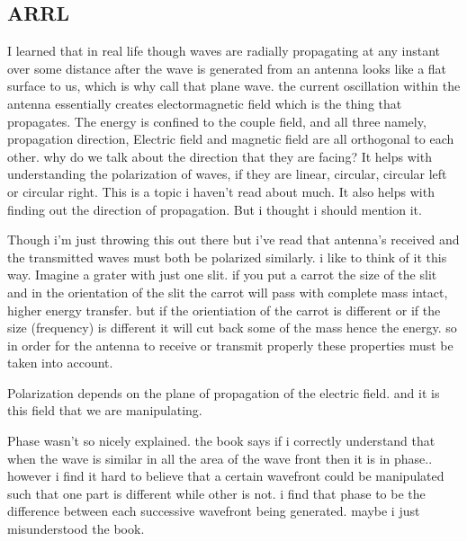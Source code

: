\documentclass[12pt]{article}
\begin{document}
\subsection*{ARRL}
I learned that in real life though waves are radially propagating at any instant over some distance after the wave is generated from an antenna looks like a flat surface to us, which is why call that plane wave. 
the current oscillation within the antenna essentially creates electormagnetic field which is the thing that propagates. 
The energy is confined to the couple field, and all three namely, propagation direction, Electric field and magnetic field are all orthogonal to each other. why do we talk about the direction that they are facing? 
It helps with understanding the polarization of waves, if they are linear, circular, circular left or circular right. This is a topic i haven't read about much. It also helps with finding out the direction of propagation. 
But i thought i should mention it. 

Though i'm just throwing this out there but i've read that antenna's received and the transmitted waves must both be polarized similarly. i like to think of it this way. 
Imagine a grater with just one slit. if you put a carrot the size of the slit and in the orientation of the slit the carrot will pass with complete mass intact,
higher energy transfer. but if the orientiation of the carrot is different or if the size (frequency) is different it will cut back some of the mass hence the energy. 
so in order for the antenna to receive or transmit properly these properties must be taken into account.

Polarization depends on the plane of propagation of the electric field. and it is this field that we are manipulating. 

Phase wasn't so nicely explained. the book says if i correctly understand that when the wave is similar in all the area of the wave front then it is in phase.. however i find it hard to believe that a certain wavefront could be manipulated such that one part is different while other is not.
i find that phase to be the difference between each successive wavefront being generated. maybe i just misunderstood the book. 
\end{document}
